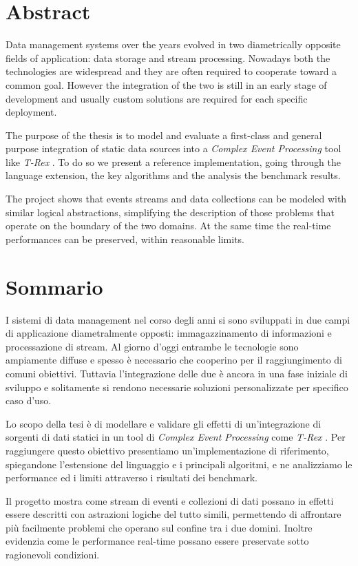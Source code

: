 \chapter*{Abstract}

Data management systems over the years evolved in two diametrically opposite fields of application: data storage and stream processing. Nowadays both the technologies are widespread and they are often required to cooperate toward a common goal. However the integration of the two is still in an early stage of development and usually custom solutions are required for each specific deployment.

The purpose of the thesis is to model and evaluate a first-class and general purpose integration of static data sources into a \emph{Complex Event Processing} tool like \emph{T-Rex} \cite{trex}. To do so we present a reference implementation, going through the language extension, the key algorithms and the analysis the benchmark results.

The project shows that events streams and data collections can be modeled with similar logical abstractions, simplifying the description of those problems that operate on the boundary of the two domains. At the same time the real-time performances can be preserved, within reasonable limits.

\chapter*{Sommario}
I sistemi di data management nel corso degli anni si sono sviluppati in due campi di applicazione diametralmente opposti: immagazzinamento di informazioni e processazione di stream. Al giorno d'oggi entrambe le tecnologie sono ampiamente diffuse e spesso è necessario che cooperino per il raggiungimento di comuni obiettivi. Tuttavia l'integrazione delle due è ancora in una fase iniziale di sviluppo e solitamente si rendono necessarie soluzioni personalizzate per specifico caso d'uso.

Lo scopo della tesi è di modellare e validare gli effetti di un'in\-te\-gra\-zio\-ne di sorgenti di dati statici in un tool di \emph{Complex Event Processing} come \emph{T-Rex} \cite{trex}. Per raggiungere questo obiettivo presentiamo un'implementazione di riferimento, spiegandone l'estensione del linguaggio e i principali algoritmi, e ne analizziamo le performance ed i limiti attraverso i risultati dei benchmark.

Il progetto mostra come stream di eventi e collezioni di dati possano in effetti essere descritti con astrazioni logiche del tutto simili, permettendo di affrontare più facilmente problemi che operano sul confine tra i due domini. Inoltre evidenzia come le performance real-time possano essere preservate sotto ragionevoli condizioni.
